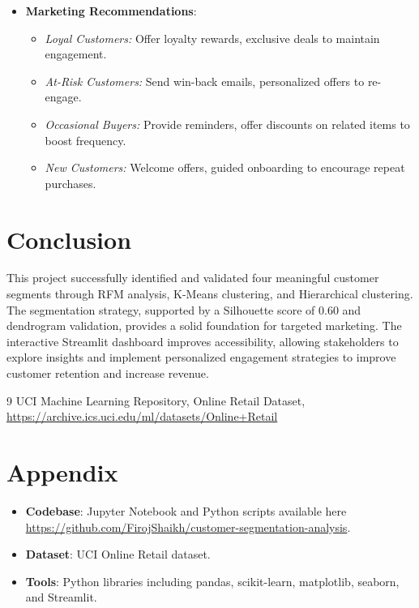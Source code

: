 \documentclass[a4paper,12pt]{article}
\begin{document}
\begin{itemize}
    \item \textbf{Marketing Recommendations}:
        \begin{itemize}
            \item \textit{Loyal Customers:} Offer loyalty rewards, exclusive deals to maintain engagement.
            \item \textit{At-Risk Customers:} Send win-back emails, personalized offers to re-engage.
            \item \textit{Occasional Buyers:} Provide reminders, offer discounts on related items to boost frequency.
            \item \textit{New Customers:} Welcome offers, guided onboarding to encourage repeat purchases.
        \end{itemize}
\end{itemize}

\section{Conclusion}

This project successfully identified and validated four meaningful customer segments through RFM analysis, K-Means clustering, and Hierarchical clustering. The segmentation strategy, supported by a Silhouette score of 0.60 and dendrogram validation, provides a solid foundation for targeted marketing. The interactive Streamlit dashboard improves accessibility, allowing stakeholders to explore insights and implement personalized engagement strategies to improve customer retention and increase revenue.

\begin{thebibliography}{9}
 UCI Machine Learning Repository, Online Retail Dataset, \url{https://archive.ics.uci.edu/ml/datasets/Online+Retail}
\end{thebibliography}

\appendix
\section{Appendix}

\begin{itemize}
    \item \textbf{Codebase}: Jupyter Notebook and Python scripts available here \url{https://github.com/FirojShaikh/customer-segmentation-analysis}.
    \item \textbf{Dataset}: UCI Online Retail dataset.
    \item \textbf{Tools}: Python libraries including pandas, scikit-learn, matplotlib, seaborn, and Streamlit.
\end{itemize}
\end{document}
